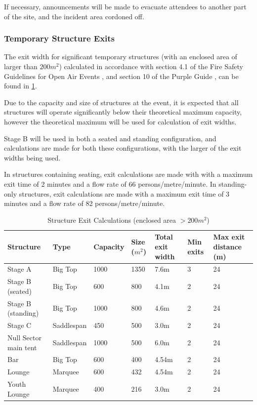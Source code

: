 If necessary, announcements will be made to evacuate attendees to another part of the
site, and the incident area cordoned off.

\subsubsection{Temporary Structure Exits}

The exit width for significant temporary structures (with an enclosed area of larger than
$200m^2$) calculated in accordance with section 4.1 of the Fire Safety Guidelines
for Open Air Events \cite{firesafety}, and section 10 of the Purple Guide \cite{purpleguide},
can be found in \cref{table:exit}.

Due to the capacity and size of structures at the event, it is expected that all structures will operate
significantly below their theoretical maximum capacity, however the theoretical maximum will be
used for calculation of exit widths.

Stage B will be used in both a seated and standing configuration, and calculations are made for
both these configurations, with the larger of the exit widths being used.

In structures containing seating, exit calculations are made with
with a maximum exit time of 2 minutes and a flow rate of 66 persons/metre/minute. In
standing-only structures, exit calculations are made with a maximum exit time of 3 minutes and a
flow rate of 82 persons/metre/minute.

\begin{table}[h!]
    \caption{Structure Exit Calculations (enclosed area $>200m^2$)}
    \label{table:exit}
\centering
\begin{tabular}{| l | l | l | l | p{2cm} | l | p{2.1cm} |}
\hline
    \textbf{Structure} & \textbf{Type} & \textbf{Capacity} & \textbf{Size ($m^2$)} &
    \textbf{Total exit width} & \textbf{Min exits} & \textbf{Max exit distance (m)} \\ \hline
    Stage A  & Big Top & 1000 & 1350  & 7.6m & 3 & 24  \\
    Stage B (seated)  & Big Top & 600  & 800 & 4.1m & 2 & 24  \\
    Stage B (standing) & Big Top & 1000 & 800 & 4.6m & 2 & 24 \\
    Stage C  & Saddlespan & 450  & 500  & 3.0m & 2 & 24  \\
    Null Sector main tent & Saddlespan & 1000 & 500  & 6.0m & 2 & 24  \\
    Bar & Big Top & 600 & 400 & 4.54m & 2 & 24 \\
    Lounge & Marquee & 600 & 432 & 4.54m & 2 & 24 \\
    Youth Lounge & Marquee & 400 & 216 & 3.0m & 2 & 24 \\
\hline
\end{tabular}
\end{table}

